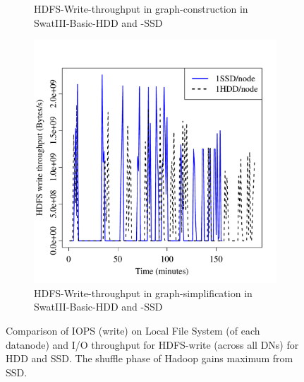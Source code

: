 \documentclass[10pt, conference, compsocconf]{IEEEtran}
\begin{document}
\begin{figure}[htb]
\begin{subfigure}[b]{0.23\textwidth}
                \caption{HDFS-Write-throughput in graph-construction in SwatIII-Basic-HDD and -SSD}
                \label{fig:BGHddSsdHdfsWrIops}
        \end{subfigure}
        \begin{subfigure}[b]{0.23\textwidth}
                \includegraphics[width=\textwidth]{Figure/SystemData/Plots/ECHddSsdHdfsWrIops.pdf}
                \caption{HDFS-Write-throughput in graph-simplification in SwatIII-Basic-HDD and -SSD}
                \label{fig:ECHddSsdHdfsWrIops}
        \end{subfigure}       
        \caption{Comparison of IOPS (write) on Local File System (of each datanode) and I/O throughput for HDFS-write (across all DNs) for HDD and SSD. The shuffle phase of Hadoop gains maximum from SSD.}\label{fig:HddSsdHdfsRWps}   
        \vspace{-1.5em}
\end{figure}
\end{document}
